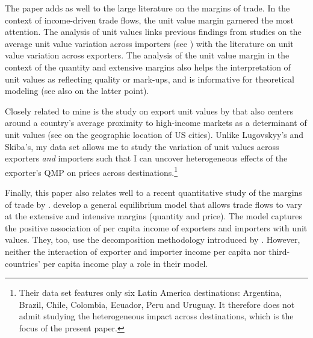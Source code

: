 \documentclass[12pt,a4paper,oneside,times]{article}   	%
\begin{document}
The paper adds as well to the large literature on the margins of trade. In the context of income-driven trade flows, the unit value margin garnered the most attention. The analysis of unit values links previous findings from studies on the average unit value variation across importers (see \cite{Hummels2004,Choi2009,Hummels2009,Bastos2010,Bastos2018}) with the literature on unit value variation across exporters. The analysis of the unit value margin in the context of the quantity and extensive margins also helps the interpretation of unit values as reflecting quality or mark-ups, and is informative for theoretical modeling (see also \cite{Baldwin2011} on the latter point).

Closely related to mine is the study on export unit values by \cite{Lugovskyy2015} that also centers around a country's average proximity to high-income markets as a determinant of unit values (see \cite{Dingel2017} on the geographic location of US cities). Unlike Lugovskyy's and Skiba's, my data set allows me to study the variation of unit values across exporters \emph{and} importers such that I can uncover heterogeneous effects of the exporter's QMP on prices across destinations.\footnote{Their data set features only six Latin America destinations: Argentina, Brazil, Chile, Colombia, Ecuador, Peru and Uruguay. It therefore does not admit studying the heterogeneous impact across destinations, which is the focus of the present paper.} 
 

Finally, this paper also relates well to a recent quantitative study of the margins of trade by \cite{Eaton2019}. \cite{Eaton2019} develop a general equilibrium model that allows trade flows to vary at the extensive and intensive margins (quantity and price). The model captures the positive association of per capita income of exporters and importers with unit values. They, too, use the decomposition methodology introduced by \cite{Hummels2005}. However, neither the interaction of exporter and importer income per capita nor third-countries' per capita income play a role in their model.
%
\end{document}
